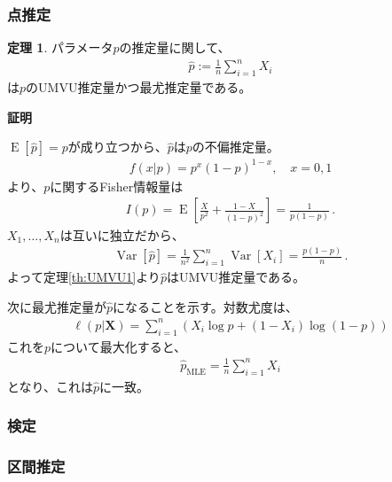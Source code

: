 \documentclass[11pt]{ltjsarticle}
\makeatletter
\theoremstyle{definition}
\newtheorem{theorem}{定理}[section]
\DeclareMathOperator{\E}{E}
\DeclareMathOperator{\Var}{Var}
\renewenvironment{proof}[1][証明]{\par
  \pushQED{\qed}%
  \normalfont \topsep6\p@\@plus6\p@\relax
  \trivlist
  \item\relax
  {\bfseries
  #1\@addpunct{.}}\hspace\labelsep\ignorespaces
}{%
  \popQED\endtrivlist\@endpefalse
}
\makeatother
\begin{document}
\subsubsection{点推定}
\begin{theorem}
    パラメータ$p$の推定量に関して、
        \begin{align}
            \widehat{p} := \frac{1}{n}\sum_{i=1}^n X_i
        \end{align}
        は$p$のUMVU推定量かつ最尤推定量である。
\end{theorem}
\begin{proof}
    $\E[\widehat{p}]=p$が成り立つから、$\widehat{p}$は$p$の不偏推定量。
    \begin{align}
        f(x|p) = p^x(1-p)^{1-x},\quad x=0, 1
    \end{align}
    より、$p$に関するFisher情報量は
    \begin{align}
        I(p) = \E\left[\frac{X}{p^2}+\frac{1-X}{(1-p)^2}\right] = \frac{1}{p(1-p)}\, .
    \end{align}
    $X_1,\ldots,X_n$は互いに独立だから、
    \begin{align}
        \Var[\widehat{p}] = \frac{1}{n^2}\sum_{i=1}^n\Var[X_i] = \frac{p(1-p)}{n}\, .
    \end{align}
    よって定理\ref{th:UMVU1}より$\widehat{p}$はUMVU推定量である。

    次に最尤推定量が$\widehat{p}$になることを示す。対数尤度は、
    \begin{align}
        \ell(p|\bm{X}) = \sum_{i=1}^n\left(X_i\log p + (1-X_i)\log(1-p)\right)
    \end{align}
    これを$p$について最大化すると、
    \begin{align}
        \widehat{p}_{\text{MLE}} = \frac{1}{n}\sum_{i=1}^n X_i
    \end{align}
    となり、これは$\widehat{p}$に一致。
\end{proof}

\subsubsection{検定}
\subsubsection{区間推定}
\end{document}

